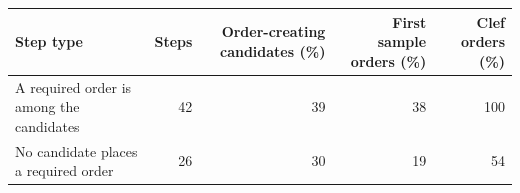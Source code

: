 \begin{tabular}{lrrrr}
\toprule
Step type & Steps & Order-creating candidates (\%) & First sample orders (\%) & Clef orders (\%) \\
\midrule
A required order is among the candidates & 42 & 39 & 38 & 100 \\
No candidate places a required order & 26 & 30 & 19 & 54 \\
\bottomrule
\end{tabular}
